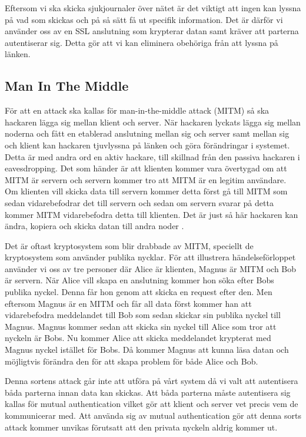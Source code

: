 Eftersom vi ska skicka sjukjournaler över nätet är det viktigt att ingen kan lyssna på vad som skickas och på så sätt få ut specifik information. Det är därför vi använder oss av en SSL anslutning som krypterar datan samt kräver att parterna autentiserar sig. Detta gör att vi kan eliminera obehöriga från att lyssna på länken. 

\subsection{Man In The Middle}

För att en attack ska kallas för man-in-the-middle attack (MITM) så ska hackaren lägga sig mellan klient och server. När hackaren lyckats lägga sig mellan noderna och fått en etablerad anslutning mellan sig och server samt mellan sig och klient kan hackaren tjuvlyssna på länken och göra förändringar i systemet. Detta är med andra ord en aktiv hackare, till skillnad från den passiva hackaren i eavesdropping. Det som händer är att klienten kommer vara övertygad om att MITM är servern och servern kommer tro att MITM är en legitim användare. Om klienten vill skicka data till servern kommer detta först gå till MITM som sedan vidarebefodrar det till servern och sedan om servern svarar på detta kommer MITM vidarebefodra detta till klienten. Det är just så här hackaren kan ändra, kopiera och skicka datan till andra noder \cite{MITM}.

Det är oftast kryptosystem som blir drabbade av MITM, speciellt de kryptosystem som använder publika nycklar. För att illustrera händelseförloppet använder vi oss av tre personer där Alice är klienten, Magnus är MITM och Bob är servern. När Alice vill skapa en anslutning kommer hon söka efter Bobs publika nyckel. Denna får hon genom att skicka en request efter den. Men eftersom Magnus är en MITM och får all data först kommer han att vidarebefodra meddelandet till Bob som sedan skickar sin publika nyckel till Magnus. Magnus kommer sedan att skicka sin nyckel till Alice som tror att nyckeln är Bobs. Nu kommer Alice att skicka meddelandet krypterat med Magnus nyckel istället för Bobs. Då kommer Magnus att kunna läsa datan och möjligtvis förändra den för att skapa problem för både Alice och Bob. 

Denna sortens attack går inte att utföra på vårt system då vi valt att autentisera båda parterna innan data kan skickas. Att båda parterna måste autentisera sig kallas för mutual authentication vilket gör att klient och server vet precis vem de kommunicerar med. Att använda sig av mutual authentication gör att denna sorts attack kommer unvikas förutsatt att den privata nyckeln aldrig kommer ut.

